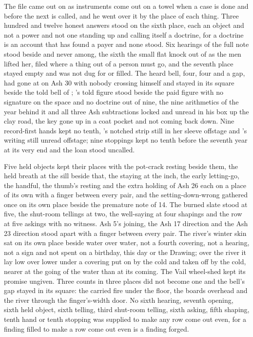 The file came out on  as instruments come out on a towel when a case is done and before the next is called, and he went over it by the place of each thing. Three hundred and twelve honest answers stood on the sixth place, each an object and not a power and not one standing up and calling itself a doctrine, for a doctrine is an account that has found a payer and none stood. Six hearings of the full note stood beside and never among, the sixth the small flat knock out of  as the men lifted her, filed where a thing out of a person must go, and the seventh place stayed empty and was not dug for or filled. The heard bell, four, four and a gap, had gone at  on Ash 30 with nobody crossing himself and stayed in its square beside the told bell of ; 's told figure stood beside the paid figure with no signature on the space and no doctrine out of nine, the nine arithmetics of the year behind it and all three Ash subtractions locked and unread in his box up the clay road, the key gone up in a coat pocket and not coming back down. Nine record-first hands kept no tenth, 's notched strip still in her sleeve offstage and 's writing still unread offstage; nine stoppings kept no tenth before the seventh year at its very end and the loan stood uncalled.

Five held objects kept their places with the pot-crack resting beside them, the held breath at the sill beside that, the staying at the inch, the early letting-go, the handful, the thumb's resting and the extra holding of Ash 26 each on a place of its own with a finger between every pair, and the setting-down-wrong gathered once on its own place beside the premature note of  14. The burned slate stood at five, the shut-room tellings at two, the well-saying at four shapings and the row at five askings with no witness. Ash 5's joining, the Ash 17 direction and the Ash 23 direction stood apart with a finger between every pair. The river's winter skin sat on its own place beside water over water, not a fourth covering, not a hearing, not a sign and not spent on a birthday, this day or the Drawing; over the river it lay low over lower under a covering put on by the cold and taken off by the cold, nearer at the going of the water than at its coming. The Vail wheel-shed kept its promise ungiven. Three counts in three places did not become one and the bell's gap stayed in its square: the carried fire under the floor, the boards overhead and the river through the finger's-width door. No sixth hearing, seventh opening, sixth held object, sixth telling, third shut-room telling, sixth asking, fifth shaping, tenth hand or tenth stopping was supplied to make any row come out even, for a finding filled to make a row come out even is a finding forged.

